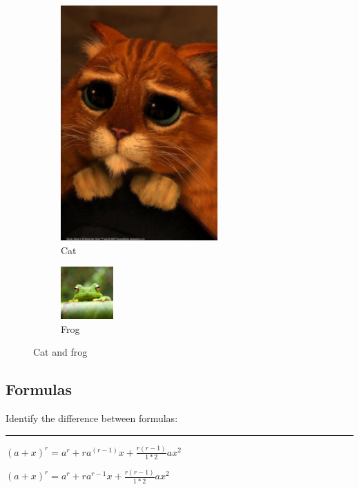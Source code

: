 \documentclass[a4paper]{article}
\begin{document}
\begin{figure}[b] %
 
    \begin{subfigure}{0.5\textwidth}
    \centering
    \includegraphics[width=0.5\linewidth, height=9cm]{Shrek.jpg} 
    \caption{Cat}
    \label{fig:subim1}
    \end{subfigure}
    \begin{subfigure}{0.5\textwidth}
    \includegraphics[width=0.9\linewidth, height=2cm]{frog.jpg}
    \caption{Frog}
    \label{fig:subim2}
    \end{subfigure}
 
\caption{Cat and frog}
\label{fig:zoo}
\end{figure}

\subsection{Formulas}

\vspace{4cm}

Identify the difference between formulas:
\bigskip

\hrule
\medskip

\large

$(a+x)^r=a^r+ra^(r-1)x+\frac{r(r-1)}{1*2}ax^2$

\bigskip

$(a+x)^r=a^r+ra^{r-1}x+\frac{r(r-1)}{1*2}ax^2$
\end{document}
